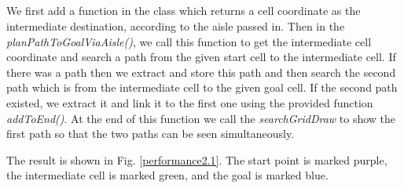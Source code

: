 \documentclass{article}
\begin{document}
\subsection{}

We first add a function in the class which returns a cell coordinate as the intermediate destination, according to the aisle passed in. Then in the \textit{planPathToGoalViaAisle()}, we call this function to get the intermediate cell coordinate and search a path from the given start cell to the intermediate cell. If there was a path then we extract and store this path and then search the second path which is from the intermediate cell to the given goal cell. If the second path existed, we extract it and link it to the first one using the provided function \textit{addToEnd()}. At the end of this function we call the \textit{searchGridDraw} to show the first path so that the two paths can be seen simultaneously.


The result is shown in Fig. \ref{performance2.1}. The start point is marked purple, the intermediate cell is marked green, and the goal is marked blue.
\end{document}
